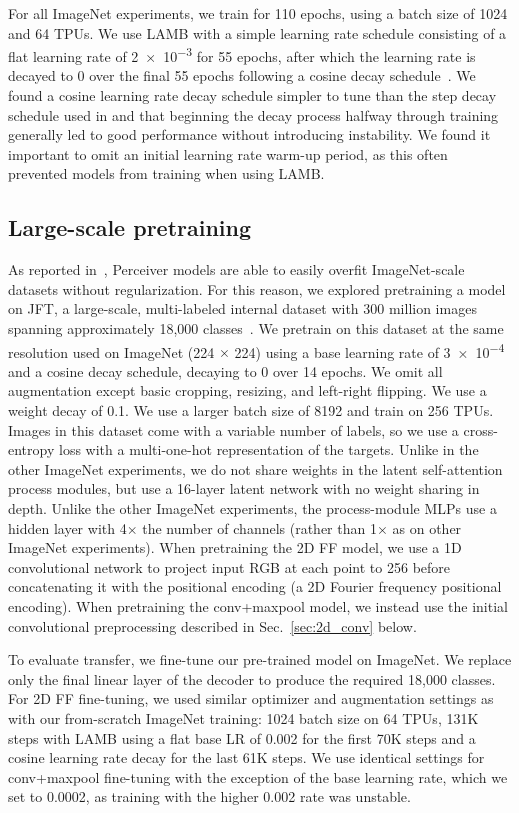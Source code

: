 \documentclass{article} %
\begin{document}
For all ImageNet experiments, we train for 110 epochs, using a batch size of 1024 and 64 TPUs. We use LAMB with a simple learning rate schedule consisting of a flat learning rate of \num{2e-3} for 55 epochs, after which the learning rate is decayed to 0 over the final 55 epochs following a cosine decay schedule~\citep{loshchilov2017sgdr}. We found a cosine learning rate decay schedule simpler to tune than the step decay schedule used in \cite{jaegle2021perceiver} and that beginning the decay process halfway through training generally led to good performance without introducing instability. We found it important to omit an initial learning rate warm-up period, as this often prevented models from training when using LAMB.

\subsection{Large-scale pretraining}

As reported in~\cite{jaegle2021perceiver}, Perceiver models are able to easily overfit ImageNet-scale datasets without regularization. For this reason, we explored pretraining a model on JFT, a large-scale, multi-labeled internal dataset with 300 million images spanning approximately 18,000 classes~\citep{sun2017revisiting}. We pretrain on this dataset at the same resolution used on ImageNet (224 $\times$ 224) using a base learning rate of \num{3e-4} and a cosine decay schedule, decaying to 0 over 14 epochs. We omit all augmentation except basic cropping, resizing, and left-right flipping. We use a weight decay of 0.1. We use a larger batch size of 8192 and train on 256 TPUs. Images in this dataset come with a variable number of labels, so we use a cross-entropy loss with a multi-one-hot representation of the targets. Unlike in the other ImageNet experiments, we do not share weights in the latent self-attention process modules, but use a 16-layer latent network with no weight sharing in depth. Unlike the other ImageNet experiments, the process-module MLPs use a hidden layer with 4$\times$ the number of channels (rather than 1$\times$ as on other ImageNet experiments). When pretraining the 2D FF model, we use a 1D convolutional network to project input RGB at each point to 256 before concatenating it with the positional encoding (a 2D Fourier frequency positional encoding). When pretraining the conv+maxpool model, we instead use the initial convolutional preprocessing described in Sec.~\ref{sec:2d_conv} below.

To evaluate transfer, we fine-tune our pre-trained model on ImageNet. We replace only the final linear layer of the decoder to produce the required 18,000 classes. For 2D FF fine-tuning, we used similar optimizer and augmentation settings as with our from-scratch ImageNet training: 1024 batch size on 64 TPUs, 131K steps with LAMB using a flat base LR of 0.002 for the first 70K steps and a cosine learning rate decay for the last 61K steps. We use identical settings for conv+maxpool fine-tuning with the exception of the base learning rate, which we set to 0.0002, as training with the higher 0.002 rate was unstable. 
\end{document}
